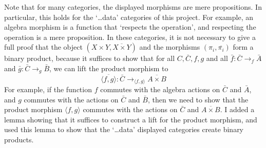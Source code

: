 Note that for many categories, the displayed morphisms are mere propositions. In particular, this holds for the `\dots data' categories of this project. For example, an algebra morphism is a function that `respects the operation', and respecting the operation is a mere proposition. In these categories, it is not necessary to give a full proof that the object $ (X \times Y, \overline{X \times Y}) $ and the morphisms $ (\pi_i, \overline{\pi_i}) $ form a binary product, because it suffices to show that for all $ C, \bar C, f, g $ and all $ \bar f : \bar C \to_f \bar A $ and $ \bar g : \bar C \to_g \bar B $, we can lift the product morphism to
\[ \overline{\langle f, g \rangle} : \bar C \to_{\langle f, g \rangle} \overline{A \times B} \]
For example, if the function $ f $ commutes with the algebra actions on $ \bar C $ and $ \bar A $, and $ g $ commutes with the actions on $ \bar C $ and $ \bar B $, then we need to show that the product morphism $ \langle f, g \rangle $ commutes with the actions on $ \bar C $ and $ \overline{A \times B} $. I added a lemma showing that it suffices to construct a lift for the product morphism, and used this lemma to show that the `\dots data' displayed categories create binary products.


